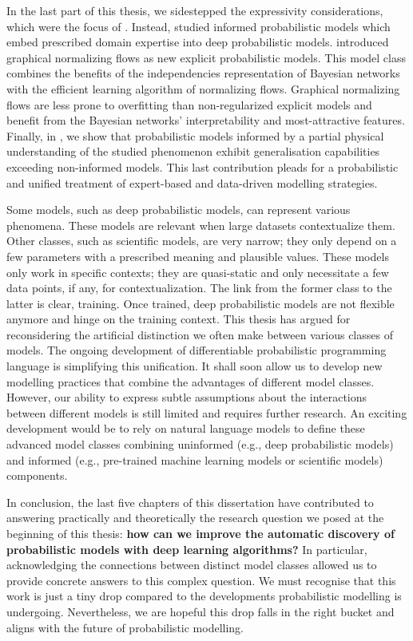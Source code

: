 In the last part of this thesis, we sidestepped the expressivity considerations, which were the focus of . Instead,  studied informed probabilistic models which embed prescribed domain expertise into deep probabilistic models.  introduced graphical normalizing flows as new explicit probabilistic models. This model class combines the benefits of the independencies representation of Bayesian networks with the efficient learning algorithm of normalizing flows. Graphical normalizing flows are less prone to overfitting than non-regularized explicit models and benefit from the Bayesian networks' interpretability and most-attractive features. Finally, in , we show that probabilistic models informed by a partial physical understanding of the studied phenomenon exhibit generalisation capabilities exceeding non-informed models. This last contribution pleads for a probabilistic and unified treatment of expert-based and data-driven modelling strategies.

Some models, such as deep probabilistic models, can represent various phenomena. These models are relevant when large datasets contextualize them. Other classes, such as scientific models, are very narrow; they only depend on a few parameters with a prescribed meaning and plausible values. These models only work in specific contexts; they are quasi-static and only necessitate a few data points, if any, for contextualization. The link from the former class to the latter is clear, training. Once trained, deep probabilistic models are not flexible anymore and hinge on the training context. This thesis has argued for reconsidering the artificial distinction we often make between various classes of models. The ongoing development of differentiable probabilistic programming language is simplifying this unification. It shall soon allow us to develop new modelling practices that combine the advantages of different model classes. However, our ability to express subtle assumptions about the interactions between different models is still limited and requires further research. An exciting development would be to rely on natural language models to define these advanced model classes combining uninformed (e.g., deep probabilistic models) and informed (e.g., pre-trained machine learning models or scientific models) components.

In conclusion, the last five chapters of this dissertation have contributed to answering practically and theoretically the research question we posed at the beginning of this thesis: \textbf{how can we improve the automatic discovery of probabilistic models with deep learning algorithms?} In particular, acknowledging the connections between distinct model classes allowed us to provide concrete answers to this complex question. We must recognise that this work is just a tiny drop compared to the developments probabilistic modelling is undergoing. Nevertheless, we are hopeful this drop falls in the right bucket and aligns with the future of probabilistic modelling.

